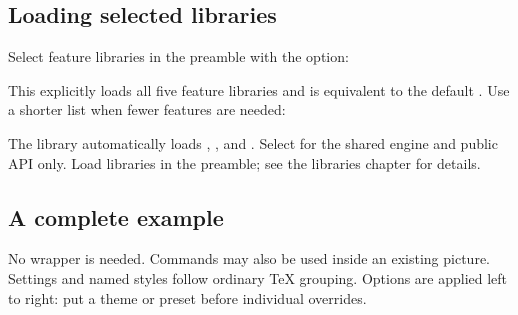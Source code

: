 \subsection{Loading selected libraries}
Select feature libraries in the preamble with the  option:
\begin{source}
\usepackage[libraries={stack,spark,heat,csv,table}]{gradbars}
\end{source}
This explicitly loads all five feature libraries and is equivalent to the
default \key{\usepackage{gradbars}}. Use a shorter list when fewer features are needed:
\begin{source}
\usepackage[libraries={stack,spark,heat}]{gradbars}
\end{source}
The  library automatically loads , , 
and . Select  for the shared engine and public API
only. Load libraries in the preamble; see the libraries chapter for details.

\subsection{A complete example}
No  wrapper is needed. Commands may also be used inside an
existing \manualTikZ{} picture. Settings and named styles follow ordinary TeX grouping.
Options are applied left to right: put a theme or preset before individual overrides.
